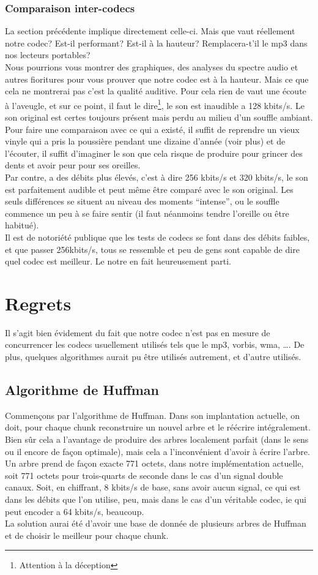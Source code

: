 \documentclass[a4paper,12pt]{report}
\begin{document}
\subsection{Comparaison inter-codecs}
La section précédente implique directement celle-ci. Mais que vaut réellement
notre codec? Est-il performant? Est-il à la hauteur? Remplacera-t'il le mp3 dans
nos lecteurs portables?\\
Nous pourrions vous montrer des graphiques, des analyses du spectre audio et
autres fioritures pour vous prouver que notre codec est à la hauteur. Mais ce
que cela ne montrerai pas c'est la qualité auditive. Pour cela rien de vaut une
écoute à l'aveugle, et sur ce point, il faut le dire\footnote{Attention à la
déception}, le son est inaudible a 128 kbits/s. Le son original est certes
toujours présent mais perdu au milieu d'un souffle ambiant. Pour faire une
comparaison avec ce qui a existé, il suffit de reprendre un vieux vinyle qui a
pris la poussière pendant une dizaine d'année (voir plus) et de l'écouter, il
suffit d'imaginer le son que cela risque de produire pour grincer des dents et
avoir peur pour ses oreilles.\\
Par contre, a des débits plus élevés, c'est à dire 256 kbits/s et 320 kbits/s,
le son est parfaitement audible et peut même être comparé avec le son original.
Les seuls différences se situent au niveau des moments ``intense'', ou le
souffle commence un peu à se faire sentir (il faut néanmoins tendre l'oreille ou
être habitué).\\
Il est de notoriété publique que les tests de codecs se font dans des débits
faibles, et que passer 256kbits/s, tous se ressemble et peu de gens sont capable
de dire quel codec est meilleur. Le notre en fait heureusement parti.
\chapter{Regrets}
Il s'agit bien évidement du fait que notre codec n'est pas en mesure de
concurrencer les codecs usuellement utilisés tels que le mp3, vorbis, wma, \ldots.
De plus, quelques algorithmes aurait pu être utilisés autrement, et d'autre
utilisés.\\
\section{Algorithme de Huffman}
Commençons par l'algorithme de Huffman. Dans son implantation actuelle, on doit,
pour chaque chunk reconstruire un nouvel arbre et le réécrire intégralement.
Bien sûr cela a l'avantage de produire des arbres localement parfait (dans le
sens ou il encore de façon optimale), mais cela a l'inconvénient d'avoir à
écrire l'arbre. Un arbre prend de façon exacte 771 octets, dans notre
implémentation actuelle, soit 771 octets pour trois-quarts de seconde dans le
cas d'un signal double canaux. Soit, en chiffrant, 8 kbits/s de base, sans avoir
aucun signal, ce qui est dans les débits que l'on utilise, peu, mais dans le cas
d'un véritable codec, ie qui peut encoder a 64 kbits/s, beaucoup.\\
La solution aurai été d'avoir une base de donnée de plusieurs arbres de Huffman
et de choisir le meilleur pour chaque chunk.
\end{document}
